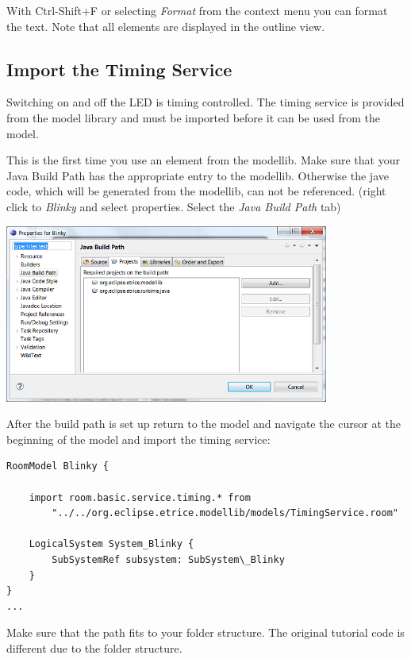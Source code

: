 With Ctrl-Shift+F or selecting \textit{Format} from the context menu you can format the text. Note that 
all elements are displayed in the outline view.

\subsection{Import the Timing Service}

Switching on and off the LED is timing controlled. The timing service is provided from the model library 
and must be imported before it can be used from the model.

This is the first time you use an element from the modellib. Make sure that your Java Build Path has the 
appropriate entry to the modellib. Otherwise the jave code, which will be generated from the modellib, can 
not be referenced.
(right click to \textit{Blinky} and select properties. Select the \textit{Java Build Path} tab) 
  
\includegraphics[width=0.8\textwidth]{images/020-Blinky16.png}

After the build path is set up return to the model and navigate the cursor at the beginning of the model 
and import the timing service: 

\begin{small}
\begin{verbatim}
RoomModel Blinky {
    
    import room.basic.service.timing.* from 
		"../../org.eclipse.etrice.modellib/models/TimingService.room" 
    
    LogicalSystem System_Blinky {
        SubSystemRef subsystem: SubSystem\_Blinky
    }
}
...     
\end{verbatim}
\end{small}

Make sure that the path fits to your folder structure. The original tutorial code is different due to the 
folder structure.  

